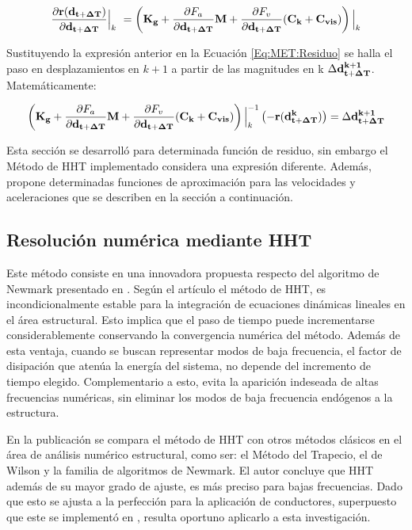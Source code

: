 \begin{equation}\label{Eq:PRE:DerivadaResiduo}
	\frac{\partial  \bf{r}(\bf{d}_{t+\Delta T})}{\partial \bf{d}_{t+\Delta T}}\Big|_k~
	= \left (\bf{K}_g+\frac{\partial\text{$ F_a$}}{\partial \bf{{d}}_{t+\Delta T}}\bf{M} + \frac{\partial\text{$ F_v$}}{\partial \bf{{d}}_{t+\Delta T}}(\bf{C}_k+\bf{C}_{vis}) \right)\Big|_k
\end{equation}

Sustituyendo la expresión anterior en la Ecuación \eqref{Eq:MET:Residuo} se halla el paso en desplazamientos en $k+1$ a partir de las magnitudes en k $\Delta \bf{d}^{k+1}_{t+\Delta T}$. Matemáticamente:

\begin{equation}\label{Eq:Pre:Incremento}
	\left (\bf{K}_g+\frac{\partial\text{$ F_a$}}{\partial \bf{{d}}_{t+\Delta T}}\bf{M} + \frac{\partial\text{$ F_v$}}{\partial \bf{{d}}_{t+\Delta T}}(\bf{C}_k+\bf{C}_{vis} )  \right)\Big|_k^{-1} \left(-\bf{r}(\bf{d}^k_{t+\Delta T})\right)=  \Delta\bf{d}^{k+1}_{t+\Delta T}
\end{equation}

Esta sección se desarrolló para determinada función de residuo, sin embargo el Método de HHT implementado considera una expresión diferente. Además, propone determinadas funciones de aproximación para las velocidades y aceleraciones que se describen en la sección a continuación. 


\subsection{Resolución numérica mediante HHT}\label{Sec:MET:HHT}
Este método consiste en una innovadora propuesta respecto del algoritmo de Newmark presentado en \citep{newmark1959method}. Según el artículo \citep{hilber1977improved} el método de HHT, es incondicionalmente estable para la integración de ecuaciones dinámicas lineales en el área estructural. Esto implica que el paso de tiempo puede incrementarse considerablemente conservando la convergencia numérica del método. Además de esta ventaja, cuando se buscan representar modos de baja frecuencia, el factor de disipación que atenúa la energía del sistema, no depende del incremento de tiempo elegido. Complementario a esto, evita la aparición indeseada de altas frecuencias numéricas, sin eliminar los modos de baja frecuencia endógenos a la estructura. 

En la publicación \citep{hilber1977improved} se compara el método de HHT con otros métodos clásicos en el área de análisis numérico estructural, como ser: el Método del Trapecio, el de Wilson y la familia de algoritmos de Newmark. El autor concluye que HHT además de su mayor grado de ajuste, es más preciso para bajas frecuencias. Dado que esto se ajusta a la perfección para la aplicación de conductores, superpuesto que este se implementó en \citep{Le2014}, resulta oportuno aplicarlo a esta investigación.

